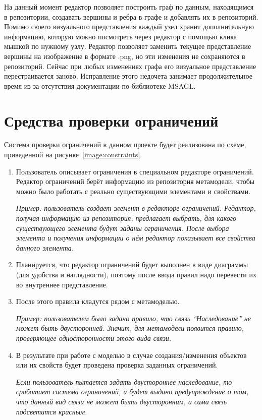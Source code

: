 \documentclass{spisok-article}
\begin{document}
На данный момент редактор позволяет построить граф по данным, находящимся в репозитории, создавать вершины и ребра в графе и добавлять их в репозиторий. Помимо своего визуального представления каждый узел хранит дополнительную информацию, которую можно посмотреть через редактор с помощью клика мышкой по нужному узлу. Редактор позволяет заменить текущее представление вершины на изображение в формате .png, но эти изменения не сохраняются в репозиторий. Сейчас при любых изменениях графа его визуальное представление перестраивается заново. Исправление этого недочета занимает продолжительное время из-за отсутствия документации по библиотеке MSAGL.

\section{Средства проверки ограничений}

Система проверки ограничений в данном проекте будет реализована по схеме, приведенной на рисунке~\ref{image:constraints}.

\begin{enumerate}
	\item Пользователь описывает ограничения в специальном редакторе ограничений. Редактор ограничений берёт информацию из  репозитория метамодели, чтобы можно было работать с реально существующими элементами и свойствами.

		\textit{Пример: пользователь создает элемент в редакторе ограничений. Редактор, получая информацию из репозитория, предлагает выбрать, для какого существующего элемента будут заданы ограничения. После выбора элемента и получения информации о нём редактор показывает все свойства данного элемента.}
	
	\item Планируется, что редактор ограничений будет выполнен в виде диаграммы (для удобства и наглядности), поэтому после ввода правил надо перевести их во внутреннее представление.

	\item После этого правила кладутся рядом с метамоделью.

		\textit{Пример: пользователем было задано правило, что связь ``Наследование'' не может быть двусторонней. Значит, для метамодели появится правило, проверяющее односторонности этого вида связи.}

	\item В результате при работе с моделью в случае создания/изменения объектов или их свойств будет проведена проверка заданных ограничений.

		\textit{Если пользователь пытается задать двустороннее наследование, то сработает система ограничений, и будет выдано предупреждение о том, что данный вид связи не может быть двусторонним, а сама связь подсветится красным.}
\end{enumerate}
\end{document}
